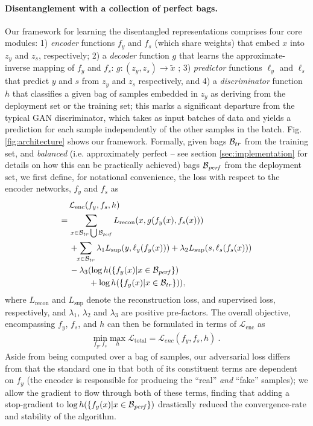 \paragraph{Disentanglement with a collection of perfect bags.}
Our framework for learning the disentangled representations comprises four core modules: 1) \emph{encoder} functions $f_y$ and $f_s$ (which share weights) that embed $x$ into $z_y$ and $z_s$, respectively; 2) a \emph{decoder} function $g$
 that learns the approximate-inverse mapping of $f_y$ and $f_s$: $g: (z_y, z_s) \rightarrow \tilde{x}$ ; 3) \emph{predictor} functions $\ell_y$ and $\ell_s$ that predict $y$ and $s$ from $z_y$ and $z_s$ respectively, and 4) a \emph{discriminator} function $h$ that classifies a given bag of samples embedded in $z_y$ as deriving from the deployment set or the training set; this marks a significant departure from the typical GAN discriminator, which takes as input batches of data and yields a prediction for each sample independently of the other samples in the batch. 
 Fig. \ref{fig:architecture} shows our framework. %
 Formally, given bags ${\mathcal{B}}_{tr}$ from the training set, and \emph{balanced} (i.e. approximately perfect -- see section \ref{sec:implementation} for details on how this can be practically achieved) bags ${\mathcal{B}}_\mathit{perf}$ from the deployment set, we first define, for notational convenience, the loss with respect to the encoder networks, $f_y$ and $f_s$ as
 \begin{align}
     &\,\mathcal{L}_{\text{enc}}(f_y, f_s, h) \nonumber\\
   =&\,\sum_{x \in \mathcal{B}_{tr} \bigcup {\mathcal{B}}_\mathit{perf}} L_{\text{recon}} (x,g(f_y(x),f_s(x))) \nonumber\\
     &\,+ \!\!\sum_{x\in {\mathcal{B}}_{tr}} \lambda_1 L_{\text{sup}} (y, \ell_y(f_y(x))) + \lambda_2 L_{\text{sup}} (s, \ell_s(f_s(x)))\nonumber\\
     &\,- \lambda_3 (
          \log h(\{f_y(x) | x \in {\mathcal{B}}_\mathit{perf}\}) \nonumber\\
         &\quad\quad\,\,\, +  \log h(\{f_y(x) | x \in \mathcal{B}_{tr}\})
     ),
     \label{eq:disentangling}
 \end{align}%
where $L_{\text{recon}}$ and $L_{\text{sup}}$ denote the reconstruction loss, and supervised loss, respectively, and $\lambda_1$, $\lambda_2$ and $\lambda_3$ are positive pre-factors.
The overall objective, encompassing $f_y$, $f_s$, and $h$ can then be formulated in terms of $\mathcal{L}_{\text{enc}}$ as
\begin{align}
    \underset{f_y, f_s}{\textrm{min}}\; \underset{h}{\textrm{max}}\;\mathcal{L}_{\text{total}} = \mathcal{L}_{enc}(f_y, f_s, h)~.
    \label{eq:disentangling_total}
\end{align}%
Aside from being computed over a bag of samples, our adversarial loss differs from that the standard one in that both of its constituent terms are dependent on $f_y$ (the encoder is responsible for producing the ``real'' \emph{and} ``fake'' samples); we allow the gradient to flow through both of these terms, finding that adding a stop-gradient to $\log h(\{f_y(x) | x \in {\mathcal{B}}_\mathit{perf}\})$ drastically reduced the convergence-rate and stability of the algorithm.

